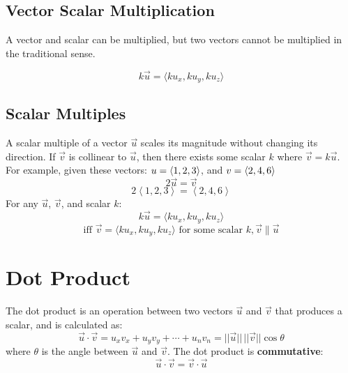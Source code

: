 \subsection{Vector Scalar Multiplication}
A vector and scalar can be multiplied, but two vectors cannot be multiplied in the traditional sense.

\begin{equation}\label{Vector Scalar Multiplication}
    k\vec{u} = \langle ku_x, ku_y, ku_z \rangle
\end{equation}


\subsection{Scalar Multiples}
A scalar multiple of a vector \(\vec{u}\) scales its magnitude without changing its direction. If \(\vec{v}\) is collinear to \(\vec{u}\), then there exists some scalar $k$ where \(\vec{v} = k\vec{u}\).
For example, given these vectors: $u = \left\langle 1, 2, 3 \right\rangle$, and $v = \left\langle 2, 4, 6 \right\rangle$
\[
2\vec{u} = \vec{v}
\]
\[
2\left\langle 1, 2, 3\right\rangle = 
\left\langle 2, 4, 6\right\rangle
\]
For any \(\vec{u}\), \(\vec{v}\), and scalar \(k\):
\[
k\vec{u} = \langle ku_x, ku_y, ku_z \rangle
\]
\[
    \text{iff } \vec{v} = \langle ku_x, ku_y, ku_z \rangle \text{ for some scalar } k, \vec{v} \parallel \vec{u}
\]


\section{Dot Product}
The dot product is an operation between two vectors \(\vec{u}\) and \(\vec{v}\) that produces a scalar, and is calculated as:
\begin{equation}\label{Dot Product}
    \vec{u} \cdot \vec{v} = u_x v_x + u_y v_y + \cdots + u_n v_n = ||\vec{u}|| \, ||\vec{v}|| \cos{\theta}
\end{equation}
where \(\theta\) is the angle between \(\vec{u}\) and \(\vec{v}\). The dot product is \textbf{commutative}:
\[
    \vec{u} \cdot \vec{v} = \vec{v} \cdot \vec{u}
\] 

